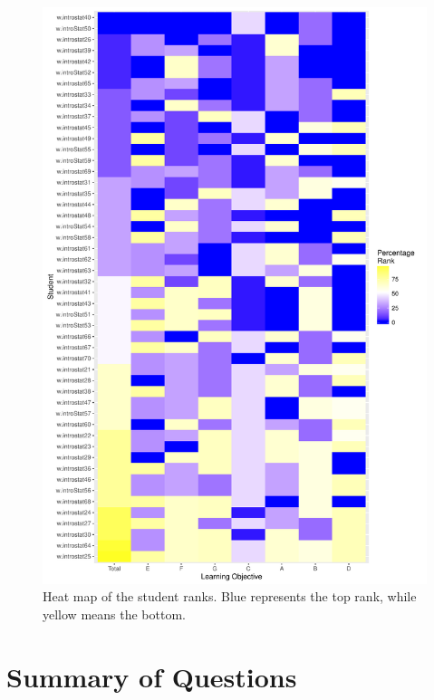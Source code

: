 \documentclass[12pt,english,nohyper]{tufte-handout}\usepackage[]{graphicx}\usepackage[]{color}
\begin{document}
\begin{center}
\begin{figure}
\begin{centering}
\includegraphics[width=0.99\linewidth]{Topic06_AB_tile_student_rank}
\par\end{centering}
\caption{\label{fig:LearningObj_rank}Heat map of the student ranks. Blue represents the top rank, while yellow means the bottom.}
\end{figure}\par\end{center}


\clearpage
\newpage{}
\section{Summary of Questions}
\end{document}

